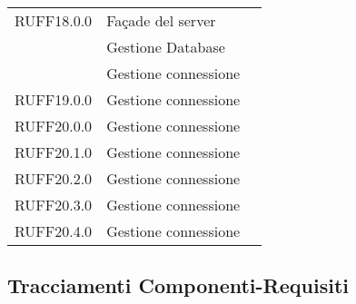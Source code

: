 \begin{center}
\begin{longtable}{lp{}l}
RUFF18.0.0 & Façade del server \\
 & Gestione Database \\
 & Gestione connessione \\
RUFF19.0.0 & Gestione connessione \\
RUFF20.0.0 & Gestione connessione \\
RUFF20.1.0 & Gestione connessione \\
RUFF20.2.0 & Gestione connessione \\
RUFF20.3.0 & Gestione connessione \\
RUFF20.4.0 & Gestione connessione \\
\bottomrule
\end{longtable}
\end{center}
\subsection{Tracciamenti Componenti-Requisiti}\label{sec:tracCompRec}

